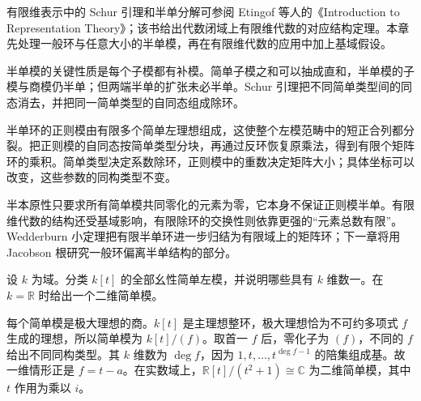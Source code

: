 \ProseParagraphBreak
有限维表示中的 Schur 引理和半单分解可参阅 Etingof 等人的《Introduction to Representation Theory》\cite[Proposition 2.3.9 and Corollary 2.3.10, pp. 11--12; Proposition 3.1.4 and Remark 3.1.5, pp. 42--43]{EtingofEtAl2011RepresentationTheory}；该书\cite[Proposition 3.5.8, p. 48]{EtingofEtAl2011RepresentationTheory}给出代数闭域上有限维代数的对应结构定理。本章先处理一般环与任意大小的半单模，再在有限维代数的应用中加上基域假设。






\begin{chaptersummary}
	半单模的关键性质是每个子模都有补模。简单子模之和可以抽成直和，半单模的子模与商模仍半单；但两端半单的扩张未必半单。Schur 引理把不同简单类型间的同态消去，并把同一简单类型的自同态组成除环。

	\ProseParagraphBreak
	半单环的正则模由有限多个简单左理想组成，这使整个左模范畴中的短正合列都分裂。把正则模的自同态按简单类型分块，再通过反环恢复原乘法，得到有限个矩阵环的乘积。简单类型决定系数除环，正则模中的重数决定矩阵大小；具体坐标可以改变，这些参数的同构类型不变。

	\ProseParagraphBreak
	半本原性只要求所有简单模共同零化的元素为零，它本身不保证正则模半单。有限维代数的结构还受基域影响，有限除环的交换性则依靠更强的“元素总数有限”。Wedderburn 小定理把有限半单环进一步归结为有限域上的矩阵环；下一章将用 Jacobson 根研究一般环偏离半单结构的部分。
\end{chaptersummary}

\BookExercises

\begin{exercise}\label{b2:ex:13-simple-polynomial-modules}
	设 \(k\) 为域。分类 \(k[t]\) 的全部幺性简单左模，并说明哪些具有 \(k\) 维数一。在 \(k=\mathbb R\) 时给出一个二维简单模。
\end{exercise}
\begin{solution}
	每个简单模是极大理想的商。\(k[t]\) 是主理想整环，极大理想恰为不可约多项式 \(f\) 生成的理想，所以简单模为 \(k[t]/(f)\)。取首一 \(f\) 后，零化子为 \((f)\)，不同的 \(f\) 给出不同同构类型。其 \(k\) 维数为 \(\deg f\)，因为 \(1,t,\ldots,t^{\deg f-1}\) 的陪集组成基。故一维情形正是 \(f=t-a\)。在实数域上，\(\mathbb R[t]/(t^2+1)\cong\mathbb C\) 为二维简单模，其中 \(t\) 作用为乘以 \(i\)。
\end{solution}

